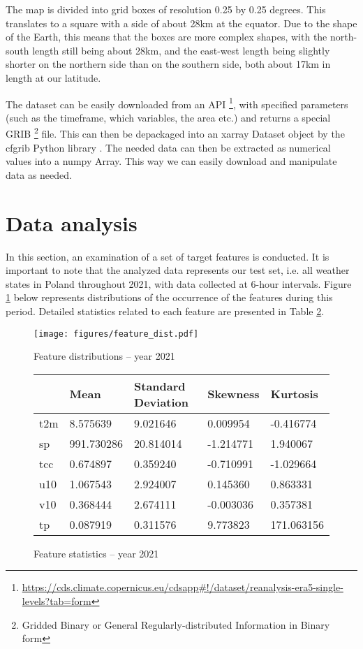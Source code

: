 The map is divided into grid boxes of resolution 0.25 by 0.25 degrees. This translates to a square with a side of about 28km at the equator. Due to the shape of the Earth, this means that the boxes are more complex shapes, with the north-south length still being about 28km, and the east-west length being slightly shorter on the northern side than on the southern side, both about 17km in length at our latitude.

The dataset can be easily downloaded from an API \footnote{\url{https://cds.climate.copernicus.eu/cdsapp\#!/dataset/reanalysis-era5-single-levels?tab=form}}, with specified parameters (such as the timeframe, which variables, the area etc.) and returns a special GRIB \footnote{Gridded Binary or General Regularly-distributed Information in Binary form} file. This can then be depackaged into an xarray \cite{hoyer2017xarray} Dataset object by the cfgrib Python library \cite{80908cfgrib}. The needed data can then be extracted as numerical values into a numpy \cite{harris2020array} Array. This way we can easily download and manipulate data as needed.


\section{Data analysis}
In this section, an examination of a set of target features is conducted. It is important to note that the analyzed data represents our test set, i.e. all weather states in Poland throughout 2021, with data collected at 6-hour intervals. Figure \ref{fig:dist} below represents distributions of the occurrence of the features during this period. Detailed statistics related to each feature are presented in Table \ref{tab:stats}.

\begin{figure}[!ht]
    \centering
    \texttt{[image: figures/feature\_dist.pdf]}
    \caption{Feature distributions -- year 2021}
    \label{fig:dist}
\end{figure} 

\begin{figure}[!ht]
    \centering
    \begin{tabular}{C{2.5cm}C{2.5cm}C{2.5cm}C{2.5cm}C{2.5cm}}
        \toprule
        & Mean & Standard Deviation & Skewness & Kurtosis \\
        \midrule
        t2m & 8.575639 & 9.021646 & 0.009954 & -0.416774 \\
        sp & 991.730286 & 20.814014 & -1.214771 & 1.940067 \\
        tcc & 0.674897 & 0.359240 & -0.710991 & -1.029664 \\
        u10 & 1.067543 & 2.924007 & 0.145360 & 0.863331 \\
        v10 & 0.368444 & 2.674111 & -0.003036 & 0.357381 \\
        tp & 0.087919 & 0.311576 & 9.773823 & 171.063156 \\
        \bottomrule
    \end{tabular}
    \caption{Feature statistics -- year 2021}
    \label{tab:stats}
\end{figure}

